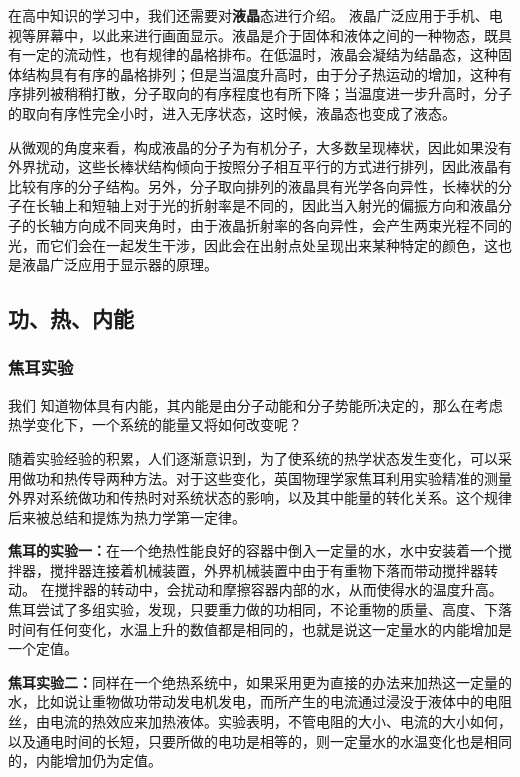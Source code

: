 在高中知识的学习中，我们还需要对\textbf{液晶}态进行介绍。 液晶广泛应用于手机、电视等屏幕中，以此来进行画面显示。液晶是介于固体和液体之间的一种物态，既具有一定的流动性，也有规律的晶格排布。在低温时，液晶会凝结为结晶态，这种固体结构具有有序的晶格排列；但是当温度升高时，由于分子热运动的增加，这种有序排列被稍稍打散，分子取向的有序程度也有所下降；当温度进一步升高时，分子的取向有序性完全小时，进入无序状态，这时候，液晶态也变成了液态。

从微观的角度来看，构成液晶的分子为有机分子，大多数呈现棒状，因此如果没有外界扰动，这些长棒状结构倾向于按照分子相互平行的方式进行排列，因此液晶有比较有序的分子结构。另外，分子取向排列的液晶具有光学各向异性，长棒状的分子在长轴上和短轴上对于光的折射率是不同的，因此当入射光的偏振方向和液晶分子的长轴方向成不同夹角时，由于液晶折射率的各向异性，会产生两束光程不同的光，而它们会在一起发生干涉，因此会在出射点处呈现出来某种特定的颜色，这也是液晶广泛应用于显示器的原理。
\subsection{功、热、内能}
\subsubsection{焦耳实验}
我们
知道物体具有内能，其内能是由分子动能和分子势能所决定的，那么在考虑热学变化下，一个系统的能量又将如何改变呢？

随着实验经验的积累，人们逐渐意识到，为了使系统的热学状态发生变化，可以采用做功和热传导两种方法。对于这些变化，英国物理学家焦耳利用实验精准的测量外界对系统做功和传热时对系统状态的影响，以及其中能量的转化关系。这个规律后来被总结和提炼为热力学第一定律。

\textbf{焦耳的实验一：}在一个绝热性能良好的容器中倒入一定量的水，水中安装着一个搅拌器，搅拌器连接着机械装置，外界机械装置中由于有重物下落而带动搅拌器转动。
在搅拌器的转动中，会扰动和摩擦容器内部的水，从而使得水的温度升高。焦耳尝试了多组实验，发现，只要重力做的功相同，不论重物的质量、高度、下落时间有任何变化，水温上升的数值都是相同的，也就是说这一定量水的内能增加是一个定值。%

\textbf{焦耳实验二：}同样在一个绝热系统中，如果采用更为直接的办法来加热这一定量的水，比如说让重物做功带动发电机发电，而所产生的电流通过浸没于液体中的电阻丝，由电流的热效应来加热液体。实验表明，不管电阻的大小、电流的大小如何，以及通电时间的长短，只要所做的电功是相等的，则一定量水的水温变化也是相同的，内能增加仍为定值。

